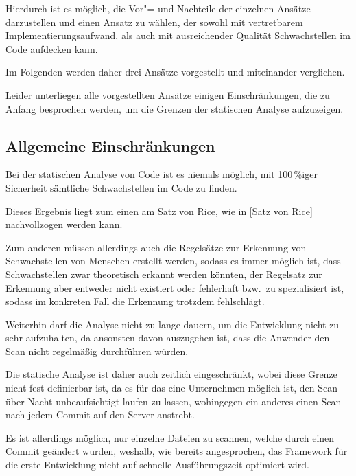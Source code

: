         Hierdurch ist es möglich,
        die Vor"= und
        Nachteile der einzelnen Ansätze darzustellen und
        einen Ansatz zu wählen,
        der sowohl
        mit vertretbarem Implementierungsaufwand,
        als auch mit ausreichender Qualität Schwachstellen im Code aufdecken kann.

        Im Folgenden werden daher drei Ansätze vorgestellt und
        miteinander verglichen.

        Leider unterliegen alle vorgestellten Ansätze einigen Einschränkungen,
        die zu Anfang besprochen werden,
        um die Grenzen der statischen Analyse aufzuzeigen.

        \subsection{Allgemeine Einschränkungen}\label{Allgemeine Einschränkungen}
            Bei der statischen Analyse von Code ist es niemals möglich,
            mit 100\,\%iger Sicherheit sämtliche Schwachstellen im Code zu finden.

            Dieses Ergebnis liegt zum einen am Satz von Rice,
            wie in
            \vref{Satz von Rice} nachvollzogen werden kann.

            Zum anderen müssen allerdings auch die Regelsätze zur Erkennung von Schwachstellen von Menschen erstellt werden,
            sodass es immer möglich ist,
            dass Schwachstellen zwar theoretisch erkannt werden könnten,
            der Regelsatz zur Erkennung aber entweder nicht existiert oder
            fehlerhaft bzw.\ zu spezialisiert ist,
            sodass im konkreten Fall die Erkennung trotzdem fehlschlägt.

            Weiterhin darf die Analyse nicht zu lange dauern,
            um die Entwicklung nicht zu sehr aufzuhalten,
            da ansonsten davon auszugehen ist,
            dass die Anwender den Scan nicht regelmäßig durchführen würden.

            Die statische Analyse ist daher auch zeitlich eingeschränkt,
            wobei diese Grenze nicht fest definierbar ist,
            da es für das eine Unternehmen möglich ist,
            den Scan über Nacht unbeaufsichtigt laufen zu lassen,
            wohingegen ein anderes einen Scan nach jedem Commit auf den Server anstrebt.

            Es ist allerdings möglich,
            nur einzelne Dateien zu scannen,
            welche durch einen Commit geändert wurden,
            weshalb, wie bereits angesprochen,
            das Framework für die erste Entwicklung nicht auf schnelle Ausführungszeit optimiert wird.

